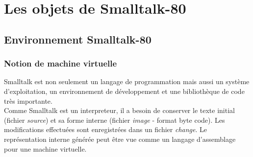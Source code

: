 



\ifx\wholebook\relax\else


\fi

\chapter{Les objets de Smalltalk-80}

%





\section{Environnement Smalltalk-80}

\subsection{Notion de machine virtuelle}
Smalltalk est non seulement un langage de programmation mais aussi un syst\`eme d'exploitation, un environnement de d\'eveloppement et une biblioth\`eque de code tr\`es importante.\\
Comme Smalltalk est un interpreteur, il a besoin de conserver le texte initial (fichier {\it source}) et sa forme interne (fichier {\it image} - format byte code). Les modifications effectu\'ees sont enregistr\'ees dans un fichier {\it change}. Le repr\'esentation interne g\'en\'er\'ee peut \^etre vue comme un langage d'assemblage pour une machine virtuelle.

